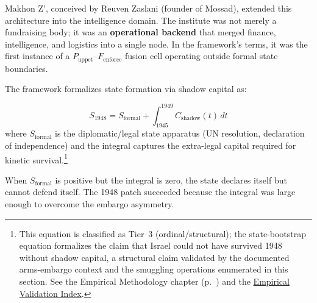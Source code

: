 Makhon Z', conceived by Reuven Zaslani (founder of Mossad), extended this architecture into the intelligence domain. The institute was not merely a fundraising body; it was an \textbf{operational backend} that merged finance, intelligence, and logistics into a single node. In the framework's terms, it was the first instance of a $P_{\text{uppet}}$--$F_{\text{enforce}}$ fusion cell operating outside formal state boundaries.

The framework formalizes state formation via shadow capital as:

\begin{equation}\label{eq:gp7-state-bootstrap}
S_{1948} = S_{\text{formal}} + \int_{1945}^{1949} C_{\text{shadow}}(t) \, dt
\end{equation}
where $S_{\text{formal}}$ is the diplomatic/legal state apparatus (UN resolution, declaration of independence) and the integral captures the extra-legal capital required for kinetic survival.\footnote{This equation is classified as Tier~3 (ordinal/structural); the state-bootstrap equation formalizes the claim that Israel could not have survived 1948 without shadow capital, a structural claim validated by the documented arms-embargo context and the smuggling operations enumerated in this section. See the Empirical Methodology chapter (p.~\pageref{ch:empirical_methodology}) and the \hyperref[app:empirical_index]{Empirical Validation Index}.}

When $S_{\text{formal}}$ is positive but the integral is zero, the state declares itself but cannot defend itself. The 1948 patch succeeded because the integral was large enough to overcome the embargo asymmetry.

